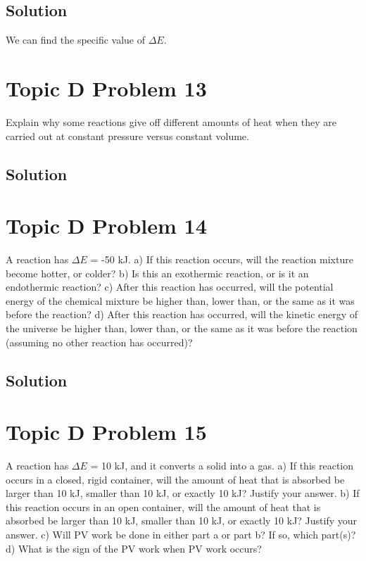 \documentclass[10pt]{article}
\begin{document}
        \subsection{Solution}
            We can find the specific value of $\Delta E$. 

    \pagebreak
    \section{Topic D Problem 13}
        Explain why some reactions give off different amounts of heat when they are carried out at constant pressure versus constant volume.
        
        \subsection{Solution}

    \pagebreak
    \section{Topic D Problem 14}
        A reaction has $\Delta E$ = -50 kJ.
a) If this reaction occurs, will the reaction mixture become hotter, or colder?
b) Is this an exothermic reaction, or is it an endothermic reaction?
c) After this reaction has occurred, will the potential energy of the chemical mixture be
higher than, lower than, or the same as it was before the reaction?
d) After this reaction has occurred, will the kinetic energy of the universe be higher than,
lower than, or the same as it was before the reaction (assuming no other reaction has
occurred)?
        
        \subsection{Solution}

    \pagebreak
    \section{Topic D Problem 15}
        A reaction has $\Delta E$ = 10 kJ, and it converts a solid into a gas.
a) If this reaction occurs in a closed, rigid container, will the amount of heat that is absorbed
be larger than 10 kJ, smaller than 10 kJ, or exactly 10 kJ? Justify your answer.
b) If this reaction occurs in an open container, will the amount of heat that is absorbed be
larger than 10 kJ, smaller than 10 kJ, or exactly 10 kJ? Justify your answer.
c) Will PV work be done in either part a or part b? If so, which part(s)?
d) What is the sign of the PV work when PV work occurs?
        
\end{document}
